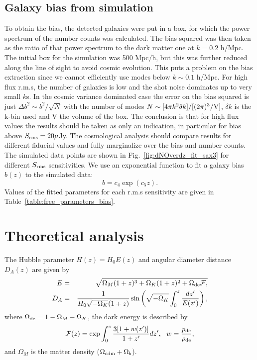 \documentclass[useAMS,usenatbib]{mn2e}
\begin{document}
\subsection{Galaxy bias from simulation}
To obtain the bias, the detected galaxies were put in a box, for which the power spectrum of the number counts was calculated. The bias squared was then taken as the ratio of that power spectrum to the dark matter one at $k=0.2$ h/Mpc. The initial box for the simulation was 500 Mpc/h, but this was further reduced along the line of sight to avoid cosmic evolution. This puts a problem on the bias extraction since we cannot efficiently use modes below $k\sim 0.1$ h/Mpc. For high flux r.m.s, the number of galaxies is low and the shot noise dominates up to very small $k$s. In the cosmic variance dominated case the error on the bias squared is just $\Delta b^2 \sim b^2/\sqrt{N}$ with the number of modes $N\sim [4 \pi k^2 \delta k]/[(2\pi)^3/{\rm V}]$, $\delta k$ is the k-bin used and V the volume of the box. The conclusion is that for high flux values the results should be taken as only an indication, in particular for bias above $S_{\rm rms} = 20 \mu$Jy. The cosmological analysis should compare results for different fiducial values and fully marginalize over the bias and number counts.
The simulated data points are shown in Fig.~\ref{fig:dNOverdz_fit_sax3} for different $S_{\rm{rms}}$ sensitivities. We use an exponential function to fit a galaxy bias $b(z)$ to the simulated data:
  \begin{equation}\label{bias}
  b = c_4 \exp({c_5z}).
  \end{equation}
Values of the fitted parameters  for each  r.m.s  sensitivity are given in Table~\ref{table:free_parameters_bias}.

\section{Theoretical analysis}


The Hubble parameter $H(z)=H_0E(z)$ and
 angular diameter distance $D_A(z)$ are given by
\begin{eqnarray}\label{EzandDz}
E&=& \sqrt{\Omega_M (1+z)^3 + \Omega_K(1+ z)^2+ 
   \Omega_{\rm de} \mathcal{F},}\\
D_{A}&=& \frac{1}{H_0\sqrt{-\Omega_K}(1+z)}\sin\left(\sqrt{-\Omega_K} \int_0^z \frac{dz'}{E(z')}\right),
\end{eqnarray}
where $\Omega_{\rm de}  = 1- \Omega_M - \Omega_K $, the dark energy is described by
\begin{equation}\label{Fz}
\mathcal{F}(z)=\exp {\int_0^z \frac{3[1+w(z')]}{1+z'}dz'} , ~~ w={p_{\rm de}\over \rho_{\rm de}},
\end{equation}
and $\Omega_M$ is the matter density ($\Omega_{{\rm cdm}} + \Omega_b$).
\end{document}
